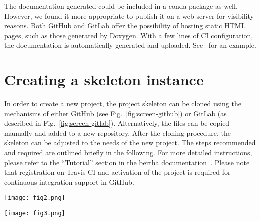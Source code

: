 \documentclass[@CLASSOPTIONS@]{tumarticle}
\begin{document}
The documentation generated could be included in a conda package as well.
However, we found it more appropriate to publish it on a web server for
visibility reasons. Both GitHub and GitLab offer the possibility of hosting
static HTML pages, such as those generated by Doxygen. With a few lines of
CI configuration, the documentation is automatically generated and uploaded.
See~\cite{bertha-doc} for an example.

\section{Creating a skeleton instance}
\label{sec:customization}

In order to create a new project, the project skeleton can be cloned using
the mechanisms of either GitHub (see Fig.~\ref{fig:screen-github}) or
GitLab (as described in Fig.~\ref{fig:screen-gitlab}). Alternatively, the
files can be copied manually and added to a new repository. After the cloning
procedure, the skeleton can be adjusted to the needs of the new project.
The steps recommended and required are outlined briefly in the following.
For more detailed instructions, please refer to the ``Tutorial'' section in
the bertha documentation~\cite{bertha-doc}. Please note that registration on
Travis CI and activation of the project is required for continuous
integration support in GitHub.

\begin{figure*}[tb]
  \centering
  \texttt{[image: fig2.png]}
  \caption{Creating an instance of the project skeleton on GitHub. On the
    project page of bertha~\cite{bertha-github}, click on
    ``Use this template''. In the following, enter the desired owner,
    repository name, and project description. The button
    ``Create repository from template'' will then create the instance.}
  \label{fig:screen-github}
\end{figure*}

\begin{figure*}[tb]
  \centering
  \texttt{[image: fig3.png]}
  \caption{Creating an instance of the project skeleton in GitLab.
    Click on the plus button to create a new project. After selecting the
    ``Create from template'' tab, choose bertha by clicking
    ``Use this template'' (currently in development, see~\cite{bertha-mr}).
    Then, enter the project name and description and click
    ``Create project''.}
  \label{fig:screen-gitlab}
\end{figure*}
\end{document}
